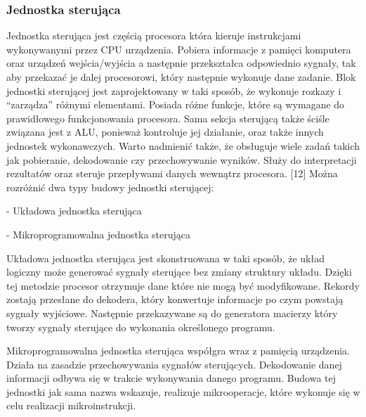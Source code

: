 \documentclass[12pt, a4paper, onside, polish]{article}				%
\begin{document}
\subsubsection{Jednostka sterująca}
\hspace{\parindent}
Jednostka sterująca jest częścią procesora która kieruje instrukcjami wykonywanymi przez CPU urządzenia. Pobiera informacje z pamięci komputera oraz urządzeń wejścia/wyjścia a następnie przekształca odpowiednio sygnały, tak aby przekazać je dalej procesorowi, który następnie wykonuje dane zadanie. Blok jednostki sterującej jest zaprojektowany w taki sposób, że wykonuje rozkazy i “zarządza” różnymi elementami. Posiada różne funkcje, które są wymagane do prawidłowego funkcjonowania procesora. Sama sekcja sterującą także ściśle związana jest z ALU, ponieważ kontroluje jej działanie, oraz także innych jednostek wykonawczych. Warto nadmienić także, że obsługuje wiele zadań takich jak pobieranie, dekodowanie czy przechowywanie wyników. Służy do interpretacji rezultatów oraz steruje przepływami danych wewnątrz procesora. [12]
\newline\newline
	Można rozróżnić dwa typy budowy jednostki sterującej: 
 
- Układowa jednostka sterująca 

- Mikroprogramowalna jednostka sterująca\newline

 

Układowa jednostka sterująca jest skonstruowana w taki sposób, że układ logiczny może generować sygnały sterujące bez zmiany struktury układu. Dzięki tej metodzie procesor otrzymuje dane które nie mogą być modyfikowane. Rekordy zostają przesłane do dekodera, który konwertuje informacje po czym powstają sygnały wyjściowe. Następnie przekazywane są do generatora macierzy który tworzy sygnały sterujące do wykonania określonego programu. \newline

 

Mikroprogramowalna jednostka sterująca współgra wraz z pamięcią urządzenia. Działa na zasadzie przechowywania sygnałów sterujących. Dekodowanie danej informacji odbywa się w trakcie wykonywania danego programu. Budowa tej jednostki jak sama nazwa wskazuje, realizuje mikrooperacje, które wykonuje się w celu realizacji mikroinstrukcji.  
\end{document}

